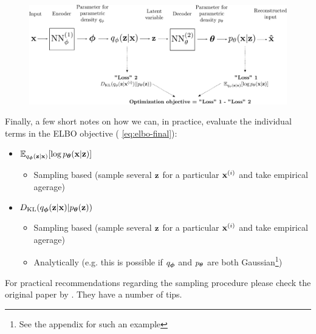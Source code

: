 \documentclass[11pt]{article}
\theoremstyle{definition}
\begin{document}
\begin{figure}[t]
	\includegraphics[width=\linewidth]{figures/vae-graph.png}
	\label{fig:vae-graph}
\end{figure}
\par 
Finally, a few short notes on how we can, in practice, evaluate the individual terms in the ELBO objective ( \autoref{eq:elbo-final}):
\begin{itemize}
	\item $\mathbb{E}_{q_{\boldsymbol{\phi}}(\mathbf{z}|\mathbf{x})}[\log p_{\boldsymbol{\theta}}(\mathbf{x}|\mathbf{z})]$
	\begin{itemize}
		\item Sampling based (sample several $\mathbf{z}$ for a particular $\mathbf{x}^{(i)}$ and take empirical agerage)
	\end{itemize}
	\item $D_{\text{KL}}(q_{\boldsymbol{\phi}}(\mathbf{z}|\mathbf{x})|p_{\boldsymbol{\theta}}(\mathbf{z}))$
	\begin{itemize}
		\item Sampling based (sample several $\mathbf{z}$ for a particular $\mathbf{x}^{(i)}$ and take empirical agerage)
		\item Analytically (e.g. this is possible if $q_{\boldsymbol{\phi}}$ and $p_{\boldsymbol{\theta}}$ are both Gaussian\footnote{See the appendix for such an example})
	\end{itemize}
\end{itemize}
For practical recommendations regarding the sampling procedure please check the original paper by \citep{kingma_auto-encoding_2013}. They have a number of tips.
\end{document}
